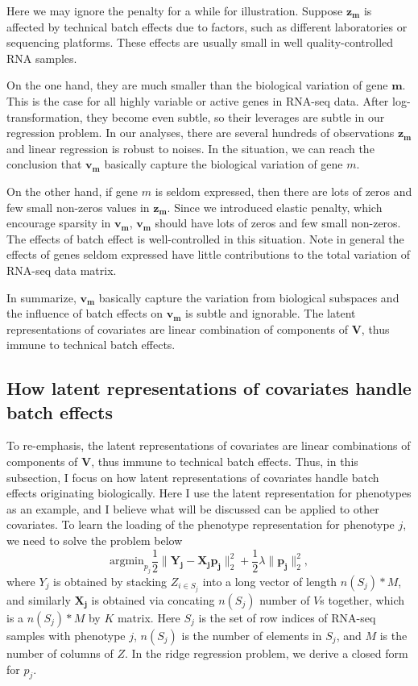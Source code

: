 \documentclass[10]{article}
\begin{document}
    Here we may ignore the penalty for a while for illustration. Suppose $\mathbf{z_m}$ is affected by technical batch effects due to factors, such as different laboratories or sequencing platforms. These effects are usually small in well quality-controlled RNA samples. 
    
    On the one hand, they are much smaller than the biological variation of gene $\mathbf{m}$. This is the case for all highly variable or active genes in RNA-seq data. After log-transformation, they become even subtle, so their leverages are subtle in our regression problem. In our analyses, there are several hundreds of observations $\mathbf{z_m}$ and linear regression is robust to noises. In the situation, we can reach the conclusion that $\mathbf{v_m}$ basically capture the biological variation of gene $m$. 

    On the other hand, if gene $m$ is seldom expressed, then there are lots of zeros and few small non-zeros values in $\mathbf{z_m}$. Since we introduced elastic penalty, which encourage sparsity in $\mathbf{v_m}$,  $\mathbf{v_m}$ should have lots of zeros and few small non-zeros. The effects of batch effect is well-controlled in this situation. Note in general the effects of genes seldom expressed have little contributions to the total variation of RNA-seq data matrix. 

    In summarize, $\mathbf{v_m}$ basically capture the variation from biological subspaces and the influence of batch effects on $\mathbf{v_m}$ is subtle and ignorable. The latent representations of covariates are linear combination of components of $\mathbf{V}$, thus immune to technical batch effects.

  \subsection{How latent representations of covariates handle batch effects}
    To re-emphasis, the latent representations of covariates are linear combinations of components of $\mathbf{V}$, thus immune to technical batch effects. Thus, in this subsection, I focus on how latent representations of covariates handle batch effects originating biologically. Here I use the latent representation for phenotypes as an example, and I believe what will be discussed can be applied to other covariates. To learn the loading of the phenotype representation for phenotype $j$, we need to solve the problem below
    \begin{equation*}
      \text{argmin}_{p_j} \frac{1}{2}\|\mathbf{Y_j} - \mathbf{X_j p_j} \|_2^2 + \frac{1}{2} \lambda \|\mathbf{p_j}\|_2^2,
    \end{equation*}
    where $Y_j$ is obtained by stacking $Z_{i \in S_j}$ into a long vector of length $n(S_j)*M$, and similarly $\mathbf{X_j}$ is obtained via concating $n(S_j)$ number of $V$s together, which is a $n(S_j)*M$ by $K$ matrix. Here $S_j$ is the set of row indices of RNA-seq samples with phenotype $j$, $n(S_j)$ is the number of elements in $S_j$, and $M$ is the number of columns of $Z$. In the ridge regression problem, we derive a closed form for $p_j$.
    
\end{document}
